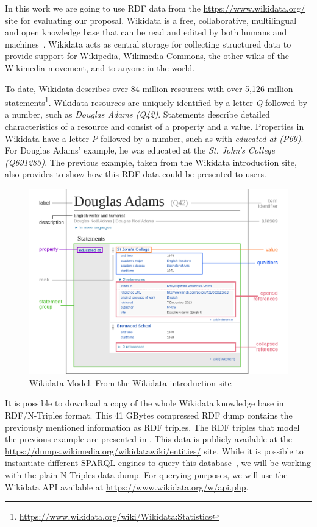 In this work we are going to use RDF data from the \url{https://www.wikidata.org/} site for evaluating our proposal. Wikidata is a free, collaborative, multilingual and open knowledge base that can be read and edited by both humans and machines~\cite{Wikidata2014}. Wikidata acts as central storage for collecting structured data to provide support for Wikipedia, Wikimedia Commons, the other wikis of the Wikimedia movement, and to anyone in the world.

To date, Wikidata describes over 84 million resources with over 5,126 million statements\footnote{\url{https://www.wikidata.org/wiki/Wikidata:Statistics}}. Wikidata resources are uniquely identified by a letter \textit{Q} followed by a number, such as \textit{Douglas Adams (Q42)}. Statements describe detailed characteristics of a resource and consist of a property and a value. Properties in Wikidata have a letter \textit{P} followed by a number, such as with \textit{educated at (P69)}. For Douglas Adams' example, he was educated at the \textit{St. John's College (Q691283)}. The previous example, taken from the Wikidata introduction site, also provides  to show how this RDF data could be presented to users.

\begin{figure}[h]
    \centering
        \includegraphics[width=\linewidth]{imagenes/Datamodel_in_Wikidata.png}
        \caption{Wikidata Model. From the Wikidata introduction site~\cite{WikidataIntroduction}}
        \label{fig:wikidataDataModel}
\end{figure}

It is possible to download a copy of the whole Wikidata knowledge base in RDF/N-Triples format. This 41 GBytes compressed RDF dump contains the previously mentioned information as RDF triples. The RDF triples that model the previous example are presented in . This data is publicly available at the \url{https://dumps.wikimedia.org/wikidatawiki/entities/} site. While it is possible to instantiate different SPARQL engines to query this database~\cite{Hernandez2016}, we will be working with the plain N-Triples data dump. For querying purposes, we will use the Wikidata API available at \url{https://www.wikidata.org/w/api.php}.

